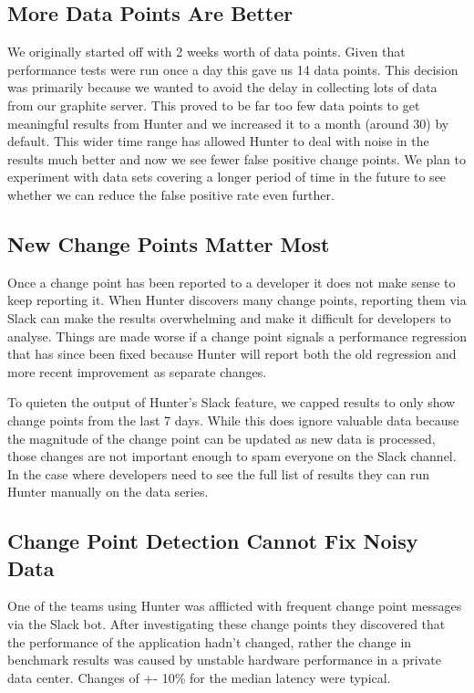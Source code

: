 \documentclass[sigconf]{acmart}
\begin{document}
\subsection{More Data Points Are Better}
We originally started off with 2 weeks worth of data points. Given that performance tests were run once a day this gave us 14 data points. This decision was primarily because we wanted to avoid the delay in collecting lots of data from our graphite server. This proved to be far too few data points to get meaningful results from Hunter and we increased it to a month (around 30) by default. This wider time range has allowed Hunter to deal with noise in the results much better and now we see fewer false positive change points. We plan to experiment with data sets covering a longer period of time in the future to see whether we can reduce the false positive rate even further.

\subsection{New Change Points Matter Most}
Once a change point has been reported to a developer it does not make sense to keep reporting it. When Hunter discovers many change points, reporting them via Slack can make the results overwhelming and make it difficult for developers to analyse. Things are made worse if a change point signals a performance regression that has since been fixed because Hunter will report both the old regression and more recent improvement as separate changes.

To quieten the output of Hunter’s Slack feature, we capped results to only show change points from the last 7 days. While this does ignore valuable data because the magnitude of the change point can be updated as new data is processed, those changes are not important enough to spam everyone on the Slack channel. In the case where developers need to see the full list of results they can run Hunter manually on the data series.

\subsection{Change Point Detection Cannot Fix Noisy Data}
One of the teams using Hunter was afflicted with frequent change point messages via the Slack bot.
After investigating these change points they discovered that the performance of the application
hadn’t changed, rather the change in benchmark results was caused by unstable hardware performance
in a private data center. Changes of +- 10\% for the median latency were typical.
\end{document}
